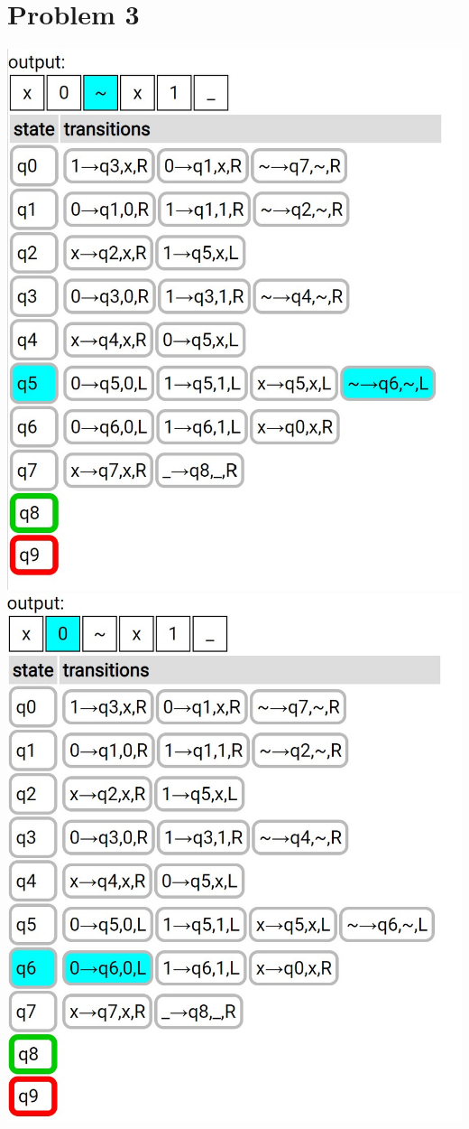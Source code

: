 \documentclass{article}
\newenvironment{problem}[1]{
  \nobreak\section*{Problem #1}
}{}
\begin{document}
\begin{problem}{3}
\begin{center}
      \includegraphics[scale=0.5]{images/4.jpg}
      \includegraphics[scale=0.5]{images/5.jpg}

\end{center}
\end{problem}
\end{document}
